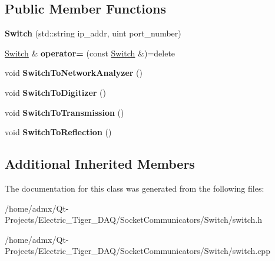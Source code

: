 \subsection*{Public Member Functions}
\begin{DoxyCompactItemize}
\item 
\hypertarget{class_switch_a8075f9eb1d911ee97166f9d6c424b766}{{\bfseries Switch} (std\+::string ip\+\_\+addr, uint port\+\_\+number)}\label{class_switch_a8075f9eb1d911ee97166f9d6c424b766}

\item 
\hypertarget{class_switch_a5d75382f2acb13883c3ef60d8b2aef7d}{\hyperlink{class_switch}{Switch} \& {\bfseries operator=} (const \hyperlink{class_switch}{Switch} \&)=delete}\label{class_switch_a5d75382f2acb13883c3ef60d8b2aef7d}

\item 
\hypertarget{class_switch_a88b6be045896b8946be86202dc4c97e3}{void {\bfseries Switch\+To\+Network\+Analyzer} ()}\label{class_switch_a88b6be045896b8946be86202dc4c97e3}

\item 
\hypertarget{class_switch_a004bbaf7459b48549f87f7b26e9353ed}{void {\bfseries Switch\+To\+Digitizer} ()}\label{class_switch_a004bbaf7459b48549f87f7b26e9353ed}

\item 
\hypertarget{class_switch_a9671dbed18c34b5e0e4c8961004d150e}{void {\bfseries Switch\+To\+Transmission} ()}\label{class_switch_a9671dbed18c34b5e0e4c8961004d150e}

\item 
\hypertarget{class_switch_abe4a4b4754fdb4979ddfa3a10fc9e127}{void {\bfseries Switch\+To\+Reflection} ()}\label{class_switch_abe4a4b4754fdb4979ddfa3a10fc9e127}

\end{DoxyCompactItemize}
\subsection*{Additional Inherited Members}


The documentation for this class was generated from the following files\+:\begin{DoxyCompactItemize}
\item 
/home/admx/\+Qt-\/\+Projects/\+Electric\+\_\+\+Tiger\+\_\+\+D\+A\+Q/\+Socket\+Communicators/\+Switch/switch.\+h\item 
/home/admx/\+Qt-\/\+Projects/\+Electric\+\_\+\+Tiger\+\_\+\+D\+A\+Q/\+Socket\+Communicators/\+Switch/switch.\+cpp\end{DoxyCompactItemize}
